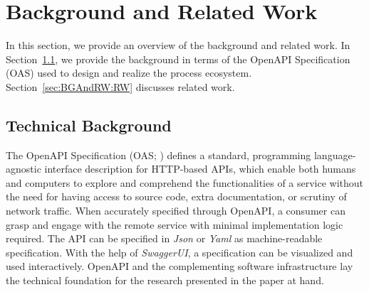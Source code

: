\section{Background and Related Work}
\label{sec:BGAndRW}
In this section, we provide an overview of the background and related work. In Section~\ref{sec:BGAndRW:BG}, we provide the background in terms of the OpenAPI Specification (OAS) used to design and realize the process ecosystem. Section~\ref{sec:BGAndRW:RW} discusses related work.

\subsection{Technical Background}
\label{sec:BGAndRW:BG}
The OpenAPI Specification (OAS; \cite{OpenAPI}) defines a standard, programming language-agnostic interface description for HTTP-based APIs, which enable both humans and computers to explore and comprehend the functionalities of a service without the need for having access to source code, extra documentation, or scrutiny of network traffic. When accurately specified through OpenAPI, a consumer can grasp and engage with the remote service with minimal implementation logic required. The API can be specified in \emph{Json} or \emph{Yaml} as machine-readable specification. With the help of \emph{SwaggerUI}, a specification can be visualized and used interactively. OpenAPI and the complementing software infrastructure lay the technical foundation for the research presented in the paper at hand.

